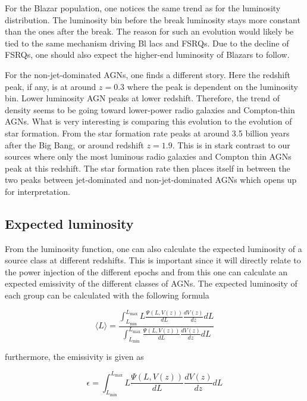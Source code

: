 For the Blazar population, one notices the same trend as for the luminosity distribution. The luminosity bin before the break luminosity stays more constant than the ones after the break. The reason for such an evolution 
would likely be tied to the same mechanism driving Bl lacs and FSRQs. Due to the decline of FSRQs, one should also expect the
higher-end luminosity of Blazars to follow.

For the non-jet-dominated AGNs, one finds a different story. Here the redshift peak, if any, is at around $z=0.3$ where the peak is dependent on the luminosity bin. Lower luminosity AGN peaks at lower redshift. Therefore, the trend of density 
seems to be going toward lower-power radio galaxies and Compton-thin AGNs. 
What is very interesting is comparing this evolution to 
the evolution of star formation. From \cite{Madau_2014} the star formation rate peaks at around 3.5 billion years after the Big Bang, 
or around redshift $z= 1.9$. This is in stark contrast to our sources where only the most luminous radio galaxies and Compton thin AGNs peak at this redshift. 
The star formation rate then places itself in between the two peaks between jet-dominated and non-jet-dominated AGNs which opens up for interpretation. 


\subsection{Expected luminosity}
\label{sec:Expt_lum}
From the luminosity function, one can also calculate the expected luminosity of a source class at different redshifts. This is important since it will directly relate to the 
power injection of the different epochs and from this one can calculate an expected emissivity of the different classes of AGNs. 
The expected luminosity of each group can be calculated with the following formula

\begin{equation}
    \langle L \rangle = \frac{\int_{L_{\text{min}}}^{L_{\text{max}}} L \frac{\Psi(L, V(z))}{dL} \frac{dV(z)}{dz} dL}{\int_{L_{\text{min}}}^{L_{\text{max}}} \frac{\Psi(L, V(z))}{dL} \frac{dV(z)}{dz} dL}
\end{equation}

furthermore, the emissivity is given as


\begin{equation}
     \epsilon  = \int_{L_{\text{min}}}^{L_{\text{max}}} L \frac{\Psi(L, V(z))}{dL} \frac{dV(z)}{dz} dL
\end{equation}

